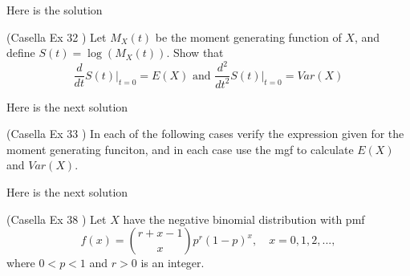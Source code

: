 \documentclass[12pt,letterpaper]{exam}
\begin{document}
\begin{questions}
	\begin{solution}
		Here is the solution
	\end{solution}
	
	\setcounter{question}{31}
	\question  (Casella Ex 32 ) Let $M_X(t)$ be the moment generating function of $X$, and define $S(t) = \log{(M_X(t))}$. Show that
	$$ \frac{d}{dt} \left. S(t) \right|_{t=0} = E(X) \text{ and }  \frac{d^2}{dt^2} \left. S(t) \right|_{t=0} = Var(X)$$
	\begin{solution}
		Here is the next solution
	\end{solution}
	
	\question  (Casella Ex 33 ) In each of the following cases verify the expression given for the moment generating funciton, and in each case use the mgf to calculate $E(X)$ and $Var(X)$.
	
	\begin{solution}
		Here is the next solution
	\end{solution}
	
	\setcounter{question}{37}
	\question  (Casella Ex 38 ) Let $X$ have the negative binomial distribution with pmf
	$$ f(x) = { r + x -1 \choose x} p^r (1-p)^x, \quad x= 0,1,2,...,$$
	where $0 < p< 1$ and $r >0$ is an integer.
\end{questions}
\end{document}
